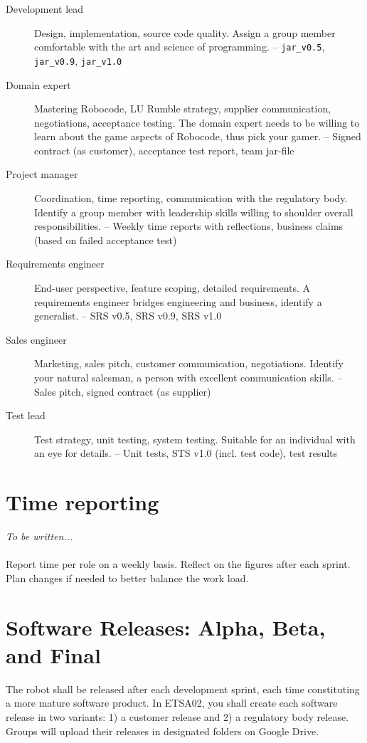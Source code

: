\documentclass{scrreprt}
\begin{document}
\begin{description}
\item[Development lead] Design, implementation, source code quality. Assign a group member comfortable with the art and science of programming. -- \texttt{jar_v0.5}, \texttt{jar_v0.9}, \texttt{jar_v1.0}
\item[Domain expert] Mastering Robocode, LU Rumble strategy, supplier communication, negotiations, acceptance testing. The domain expert needs to be willing to learn about the game aspects of Robocode, thus pick your gamer. -- Signed contract (as customer), acceptance test report, team jar-file
\item[Project manager] Coordination, time reporting, communication with the regulatory body. Identify a group member with leadership skills willing to shoulder overall responsibilities. -- Weekly time reports with reflections, business claims (based on failed acceptance test)
\item[Requirements engineer] End-user perspective, feature scoping, detailed requirements. A requirements engineer bridges engineering and business, identify a generalist. -- SRS v0.5, SRS v0.9, SRS v1.0
\item[Sales engineer] Marketing, sales pitch, customer communication, negotiations. Identify your natural salesman, a person with excellent communication skills. -- Sales pitch, signed contract (as supplier)
\item[Test lead] Test strategy, unit testing, system testing. Suitable for an individual with an eye for details. -- Unit tests, STS v1.0 (incl. test code), test results
\end{description}

\section{Time reporting} \label{sec:time}
\emph{To be written...}\\\\
Report time per role on a weekly basis. Reflect on the figures after each sprint. Plan changes if needed to better balance the work load.

\section{Software Releases: Alpha, Beta, and Final}
The robot shall be released after each development sprint, each time constituting a more mature software product. In ETSA02, you shall create each software release in two variants: 1) a customer release and 2) a regulatory body release. Groups will upload their releases in designated folders on Google Drive.
\end{document}
